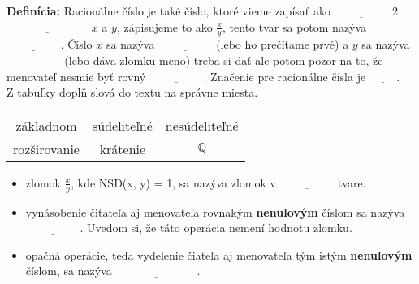 \documentclass[12pt]{article}
\begin{document}
	\textbf{Definícia:} Racionálne číslo je také číslo, ktoré vieme zapísať ako $\underline{\hspace{2cm}}$ 2 $\underline{\hspace{3cm}}$ $x$ a $y$, zápisujeme to ako $\frac{x}{y}$, tento tvar sa potom nazýva $\underline{\hspace{2cm}}$. Číslo $x$ sa nazýva $\underline{\hspace{2cm}}$ (lebo ho prečítame prvé) a $y$ sa nazýva $\underline{\hspace{2cm}}$ (lebo dáva zlomku meno) treba si dať ale potom pozor na to, že menovateľ nesmie byť rovný $\underline{\hspace{2cm}}$. Značenie pre racionálne čísla je $\underline{\hspace{1cm}}$.\\
	
	
	Z tabuľky doplň slová do textu na správne miesta.\\
	\begin{table}[!hbt]
		\centering
		\begin{tabular}{|ccc|}
			\hline
			základnom& súdeliteľné& nesúdeliteľné\\
			rozširovanie& krátenie& $\mathbb{Q}$\\
			\hline
		\end{tabular}
	\end{table}
	
	\begin{itemize}
		\item zlomok $\frac{x}{y}$, kde NSD(x, y) = 1, sa nazýva zlomok v $\underline{\hspace{2cm}}$ tvare.
		\item vynásobenie čitateľa aj menovateľa rovnakým \textbf{nenulovým} číslom sa nazýva $\underline{\hspace{2cm}}$. Uvedom si, že táto operácia nemení hodnotu zlomku.
		\item opačná operácie, teda vydelenie čiateľa aj menovateľa tým istým \textbf{nenulovým} číslom, sa nazýva $\underline{\hspace{3cm}}$.
	\end{itemize}
	
	
	
	
\end{document}
